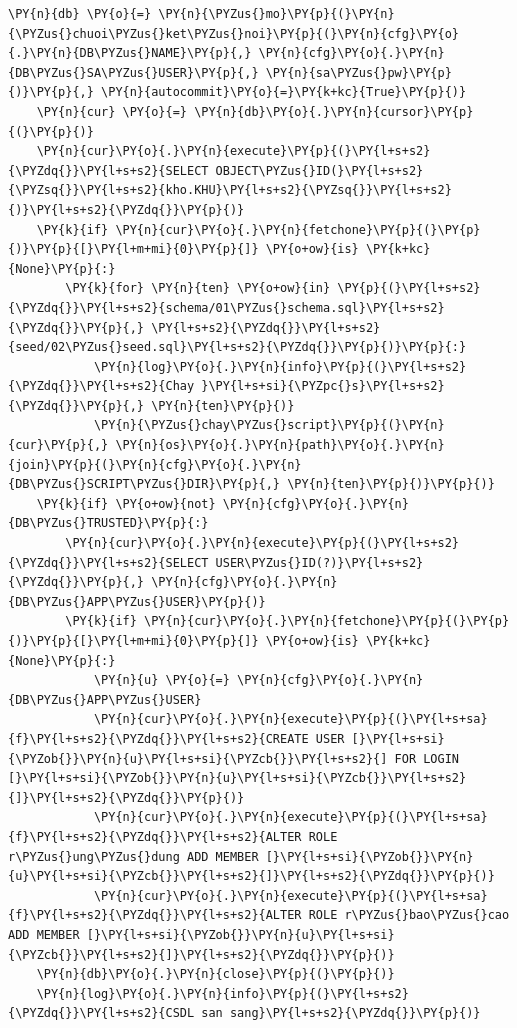 \begin{Verbatim}[commandchars=\\\{\},frame=single,framerule=0.3pt,rulecolor=\color{black!40},fontsize=\footnotesize,breaklines=true]
    \PY{n}{db} \PY{o}{=} \PY{n}{\PYZus{}mo}\PY{p}{(}\PY{n}{\PYZus{}chuoi\PYZus{}ket\PYZus{}noi}\PY{p}{(}\PY{n}{cfg}\PY{o}{.}\PY{n}{DB\PYZus{}NAME}\PY{p}{,} \PY{n}{cfg}\PY{o}{.}\PY{n}{DB\PYZus{}SA\PYZus{}USER}\PY{p}{,} \PY{n}{sa\PYZus{}pw}\PY{p}{)}\PY{p}{,} \PY{n}{autocommit}\PY{o}{=}\PY{k+kc}{True}\PY{p}{)}
    \PY{n}{cur} \PY{o}{=} \PY{n}{db}\PY{o}{.}\PY{n}{cursor}\PY{p}{(}\PY{p}{)}
    \PY{n}{cur}\PY{o}{.}\PY{n}{execute}\PY{p}{(}\PY{l+s+s2}{\PYZdq{}}\PY{l+s+s2}{SELECT OBJECT\PYZus{}ID(}\PY{l+s+s2}{\PYZsq{}}\PY{l+s+s2}{kho.KHU}\PY{l+s+s2}{\PYZsq{}}\PY{l+s+s2}{)}\PY{l+s+s2}{\PYZdq{}}\PY{p}{)}
    \PY{k}{if} \PY{n}{cur}\PY{o}{.}\PY{n}{fetchone}\PY{p}{(}\PY{p}{)}\PY{p}{[}\PY{l+m+mi}{0}\PY{p}{]} \PY{o+ow}{is} \PY{k+kc}{None}\PY{p}{:}
        \PY{k}{for} \PY{n}{ten} \PY{o+ow}{in} \PY{p}{(}\PY{l+s+s2}{\PYZdq{}}\PY{l+s+s2}{schema/01\PYZus{}schema.sql}\PY{l+s+s2}{\PYZdq{}}\PY{p}{,} \PY{l+s+s2}{\PYZdq{}}\PY{l+s+s2}{seed/02\PYZus{}seed.sql}\PY{l+s+s2}{\PYZdq{}}\PY{p}{)}\PY{p}{:}
            \PY{n}{log}\PY{o}{.}\PY{n}{info}\PY{p}{(}\PY{l+s+s2}{\PYZdq{}}\PY{l+s+s2}{Chay }\PY{l+s+si}{\PYZpc{}s}\PY{l+s+s2}{\PYZdq{}}\PY{p}{,} \PY{n}{ten}\PY{p}{)}
            \PY{n}{\PYZus{}chay\PYZus{}script}\PY{p}{(}\PY{n}{cur}\PY{p}{,} \PY{n}{os}\PY{o}{.}\PY{n}{path}\PY{o}{.}\PY{n}{join}\PY{p}{(}\PY{n}{cfg}\PY{o}{.}\PY{n}{DB\PYZus{}SCRIPT\PYZus{}DIR}\PY{p}{,} \PY{n}{ten}\PY{p}{)}\PY{p}{)}
    \PY{k}{if} \PY{o+ow}{not} \PY{n}{cfg}\PY{o}{.}\PY{n}{DB\PYZus{}TRUSTED}\PY{p}{:}
        \PY{n}{cur}\PY{o}{.}\PY{n}{execute}\PY{p}{(}\PY{l+s+s2}{\PYZdq{}}\PY{l+s+s2}{SELECT USER\PYZus{}ID(?)}\PY{l+s+s2}{\PYZdq{}}\PY{p}{,} \PY{n}{cfg}\PY{o}{.}\PY{n}{DB\PYZus{}APP\PYZus{}USER}\PY{p}{)}
        \PY{k}{if} \PY{n}{cur}\PY{o}{.}\PY{n}{fetchone}\PY{p}{(}\PY{p}{)}\PY{p}{[}\PY{l+m+mi}{0}\PY{p}{]} \PY{o+ow}{is} \PY{k+kc}{None}\PY{p}{:}
            \PY{n}{u} \PY{o}{=} \PY{n}{cfg}\PY{o}{.}\PY{n}{DB\PYZus{}APP\PYZus{}USER}
            \PY{n}{cur}\PY{o}{.}\PY{n}{execute}\PY{p}{(}\PY{l+s+sa}{f}\PY{l+s+s2}{\PYZdq{}}\PY{l+s+s2}{CREATE USER [}\PY{l+s+si}{\PYZob{}}\PY{n}{u}\PY{l+s+si}{\PYZcb{}}\PY{l+s+s2}{] FOR LOGIN [}\PY{l+s+si}{\PYZob{}}\PY{n}{u}\PY{l+s+si}{\PYZcb{}}\PY{l+s+s2}{]}\PY{l+s+s2}{\PYZdq{}}\PY{p}{)}
            \PY{n}{cur}\PY{o}{.}\PY{n}{execute}\PY{p}{(}\PY{l+s+sa}{f}\PY{l+s+s2}{\PYZdq{}}\PY{l+s+s2}{ALTER ROLE r\PYZus{}ung\PYZus{}dung ADD MEMBER [}\PY{l+s+si}{\PYZob{}}\PY{n}{u}\PY{l+s+si}{\PYZcb{}}\PY{l+s+s2}{]}\PY{l+s+s2}{\PYZdq{}}\PY{p}{)}
            \PY{n}{cur}\PY{o}{.}\PY{n}{execute}\PY{p}{(}\PY{l+s+sa}{f}\PY{l+s+s2}{\PYZdq{}}\PY{l+s+s2}{ALTER ROLE r\PYZus{}bao\PYZus{}cao ADD MEMBER [}\PY{l+s+si}{\PYZob{}}\PY{n}{u}\PY{l+s+si}{\PYZcb{}}\PY{l+s+s2}{]}\PY{l+s+s2}{\PYZdq{}}\PY{p}{)}
    \PY{n}{db}\PY{o}{.}\PY{n}{close}\PY{p}{(}\PY{p}{)}
    \PY{n}{log}\PY{o}{.}\PY{n}{info}\PY{p}{(}\PY{l+s+s2}{\PYZdq{}}\PY{l+s+s2}{CSDL san sang}\PY{l+s+s2}{\PYZdq{}}\PY{p}{)}
\end{Verbatim}
